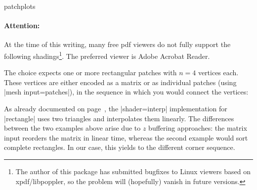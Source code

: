 {\begin{pgfplotslibrary}{patchplots}
	\paragraph{Attention:} At the time of this writing, many free pdf viewers do not fully support the following shadings\footnote{The author of this package has submitted bugfixes to Linux viewers based on xpdf/libpoppler, so the problem will (hopefully) vanish in future versions.}. The preferred viewer is Adobe Acrobat Reader.

	The choice  expects one or more rectangular patches with $n=4$ vertices each. These vertices are either encoded as a matrix or as individual patches (using |mesh input=patches|), in the sequence in which you would connect the vertices:
\begin{codeexample}[]
\end{codeexample}
\begin{codeexample}[]
\end{codeexample}
	\noindent As already documented on page~\pageref{key:patch:type}, the |shader=interp| implementation for |rectangle| uses two triangles and interpolates them linearly. The differences between the two examples above arise due to $z$ buffering approaches: the matrix input reorders the matrix in linear time, whereas the second example would sort complete rectangles. In our case, this yields to the different corner sequence.


\end{pgfplotslibrary}}
